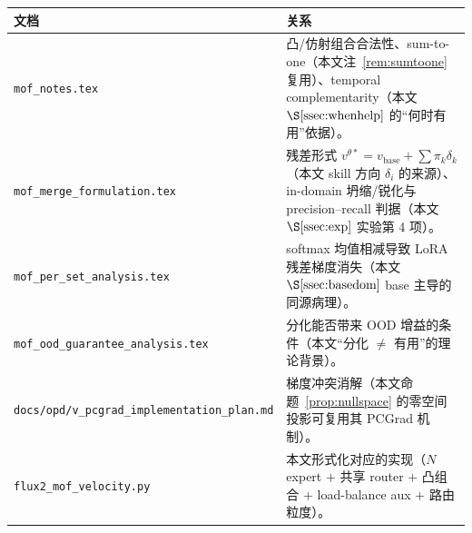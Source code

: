 \documentclass[11pt,a4paper]{article}
\newcommand{\base}{\mathrm{base}}
\newcommand{\stu}{\theta}
\newcommand{\vbase}{v_{\base}}
\theoremstyle{definition}
\begin{document}
\begin{center}
\renewcommand{\arraystretch}{1.35}
\footnotesize
\begin{tabular}{@{}p{4.8cm}p{8.6cm}@{}}
\toprule
\textbf{文档} & \textbf{关系} \\
\midrule
\texttt{mof\_notes.tex} &
凸/仿射组合合法性、sum-to-one（本文注~\ref{rem:sumtoone} 复用）、temporal complementarity（本文
$\S\ref{ssec:whenhelp}$ 的``何时有用''依据）。 \\
\texttt{mof\_merge\_formulation.tex} &
残差形式 $v^{\stu*}=\vbase+\sum\pi_k\delta_k$（本文 skill 方向 $\delta_i$ 的来源）、in-domain
坍缩/锐化与 precision--recall 判据（本文 $\S\ref{ssec:exp}$ 实验第 4 项）。 \\
\texttt{mof\_per\_set\_analysis.tex} &
softmax 均值相减导致 LoRA 残差梯度消失（本文 $\S\ref{ssec:basedom}$ base 主导的同源病理）。 \\
\texttt{mof\_ood\_guarantee\_analysis.tex} &
分化能否带来 OOD 增益的条件（本文``分化 $\neq$ 有用''的理论背景）。 \\
\texttt{docs/opd/v\_pcgrad\_implementation\_plan.md} &
梯度冲突消解（本文命题~\ref{prop:nullspace} 的零空间投影可复用其 PCGrad 机制）。 \\
\texttt{flux2\_mof\_velocity.py} &
本文形式化对应的实现（$N$ expert $+$ 共享 router $+$ 凸组合 $+$ load-balance aux $+$ 路由粒度）。 \\
\bottomrule
\end{tabular}
\end{center}
\end{document}
